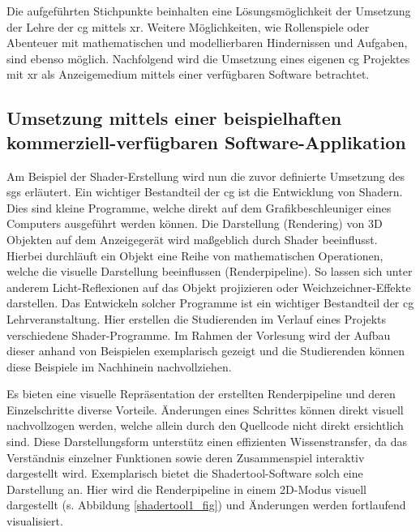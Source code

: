 \documentclass[conference]{IEEEtran}
\begin{document}
Die aufgeführten Stichpunkte beinhalten eine Lösungsmöglichkeit der Umsetzung der Lehre der \gls{cg} mittels \gls{xr}.
Weitere Möglichkeiten, wie Rollenspiele oder Abenteuer mit mathematischen und modellierbaren Hindernissen und Aufgaben, sind ebenso möglich.
Nachfolgend wird die Umsetzung eines eigenen \gls{cg} Projektes mit \gls{xr} als Anzeigemedium mittels einer verfügbaren Software betrachtet.



\subsection{Umsetzung mittels einer beispielhaften kommerziell-verfügbaren Software-Applikation}

Am Beispiel der Shader-Erstellung wird nun die zuvor definierte Umsetzung des \gls{sg}s erläutert. 
Ein wichtiger Bestandteil der \gls{cg} ist die Entwicklung von Shadern. 
Dies sind kleine Programme, welche direkt auf dem Grafikbeschleuniger eines Computers ausgeführt werden können.
Die Darstellung (Rendering) von 3D Objekten auf dem Anzeigegerät wird maßgeblich durch Shader beeinflusst. 
Hierbei durchläuft ein Objekt eine Reihe von mathematischen Operationen, welche die visuelle Darstellung beeinflussen (Renderpipeline). 
So lassen sich unter anderem Licht-Reflexionen auf das Objekt projizieren oder Weichzeichner-Effekte darstellen.
Das Entwickeln solcher Programme ist ein wichtiger Bestandteil der \gls{cg} Lehrveranstaltung.
Hier erstellen die Studierenden im Verlauf eines Projekts verschiedene Shader-Programme.
Im Rahmen der Vorlesung wird der Aufbau dieser anhand von Beispielen exemplarisch gezeigt und die Studierenden können diese Beispiele im Nachhinein nachvollziehen.

Es bieten eine visuelle Repräsentation der erstellten Renderpipeline und deren Einzelschritte diverse Vorteile.
Änderungen eines Schrittes können direkt visuell nachvollzogen werden, welche allein durch den Quellcode nicht direkt ersichtlich sind.
Diese Darstellungsform unterstütz einen effizienten Wissenstransfer, da das Verständnis einzelner Funktionen sowie deren Zusammenspiel interaktiv dargestellt wird.
Exemplarisch bietet die Shadertool-Software\cite{shadertool} solch eine Darstellung an.
Hier wird die Renderpipeline in einem 2D-Modus visuell dargestellt (s. Abbildung \ref{shadertool1_fig}) und Änderungen werden fortlaufend visualisiert.
\end{document}
